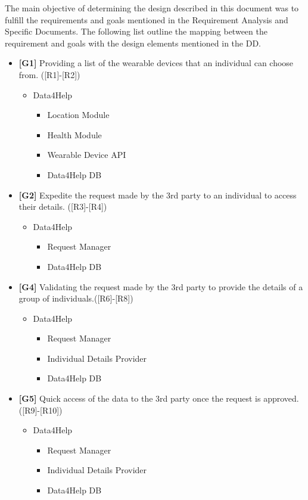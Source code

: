 The main objective of determining the design described in this document was to fulfill the requirements and goals mentioned in the Requirement Analysis and Specific Documents.\newline
The following list outline the mapping between the requirement and goals with the design elements mentioned in the DD.\newline

\begin{itemize}

\item\textbf{[G1]} Providing a list of the wearable devices that an individual can choose from. ([R1]-[R2])
\begin{itemize}
\item Data4Help
\begin{itemize}
\item Location Module
\item Health Module
\item Wearable Device API
\item Data4Help DB
\end{itemize}
\end{itemize}

\item\textbf{[G2]} Expedite the request made by the 3rd party to an individual to access their details. ([R3]-[R4])
\begin{itemize}
\item Data4Help
\begin{itemize}
\item Request Manager
\item Data4Help DB
\end{itemize}
\end{itemize}

\item\textbf{[G4]} Validating the request made by the 3rd party to provide the details of a group of individuals.([R6]-[R8])
\begin{itemize}
\item Data4Help
\begin{itemize}
\item Request Manager
\item Individual Details Provider
\item Data4Help DB
\end{itemize}
\end{itemize}

\item\textbf{[G5]} Quick access of the data to the 3rd party once the request is approved.([R9]-[R10])
\begin{itemize}
\item Data4Help
\begin{itemize}
\item Request Manager
\item Individual Details Provider
\item Data4Help DB
\end{itemize}
\end{itemize}


\end{itemize}

